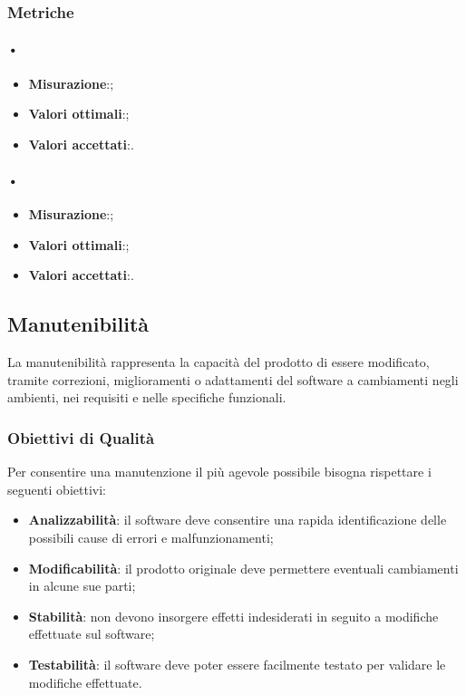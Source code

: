 \subsubsection{Metriche}

\paragraph{•}
\begin{itemize}
\item \textbf{Misurazione}:;
\item \textbf{Valori ottimali}:;
\item \textbf{Valori accettati}:.
\end{itemize}

\paragraph{•}
\begin{itemize}
\item \textbf{Misurazione}:;
\item \textbf{Valori ottimali}:;
\item \textbf{Valori accettati}:.
\end{itemize}

\subsection{Manutenibilità}
La manutenibilità rappresenta la capacità del prodotto di essere modificato, tramite correzioni, miglioramenti o adattamenti del software a cambiamenti negli ambienti, nei requisiti e nelle specifiche funzionali.

\subsubsection{Obiettivi di Qualità}
Per consentire una manutenzione il più agevole possibile bisogna rispettare i seguenti obiettivi:
\begin{itemize}
\item \textbf{Analizzabilità}: il software deve consentire una rapida identificazione delle possibili cause di errori e malfunzionamenti;
\item \textbf{Modificabilità}: il prodotto originale deve permettere eventuali cambiamenti in alcune sue parti;
\item \textbf{Stabilità}: non devono insorgere effetti indesiderati in seguito a modifiche effettuate sul software;
\item \textbf{Testabilità}: il software deve poter essere facilmente testato per validare le modifiche effettuate.
\end{itemize}

